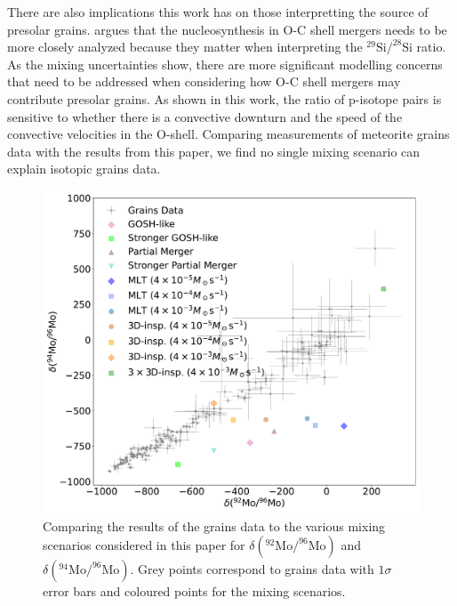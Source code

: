 There are also implications this work has on those interpretting the source of presolar grains. 
\cite{fokSiliconIsotopicComposition2024} argues that the nucleosynthesis in O-C shell mergers needs to be more closely analyzed because they matter when interpreting the $^{29}\mathrm{Si}/^{28}\mathrm{Si}$ ratio. 
As the mixing uncertainties show, there are more significant modelling concerns that need to be addressed when considering how O-C shell mergers may contribute presolar grains.
As shown in this work, the ratio of p-isotope pairs is sensitive to whether there is a convective downturn and the speed of the convective velocities in the O-shell.
Comparing measurements of meteorite grains data \citep{hynesPresolarGrainDatabase2009,stephanPresolarGrainDatabase2024a,stephanPresolarGrainDatabase2024} with the results from this paper, we find no single mixing scenario can explain isotopic grains data.
\begin{figure}[!htbp]
\includegraphics[width=\textwidth]{chapters/2/figures/grains_Mo92_Mo94_Mo96.pdf}
\caption{Comparing the results of the grains data to the various mixing scenarios considered in this paper for $\delta(^{92}\mathrm{Mo}/^{96}\mathrm{Mo})$ and $\delta(^{94}\mathrm{Mo}/^{96}\mathrm{Mo})$. Grey points correspond to grains data with $1\sigma$ error bars and coloured points for the mixing scenarios.
\label{fig:grains_Mo}}
\end{figure}
